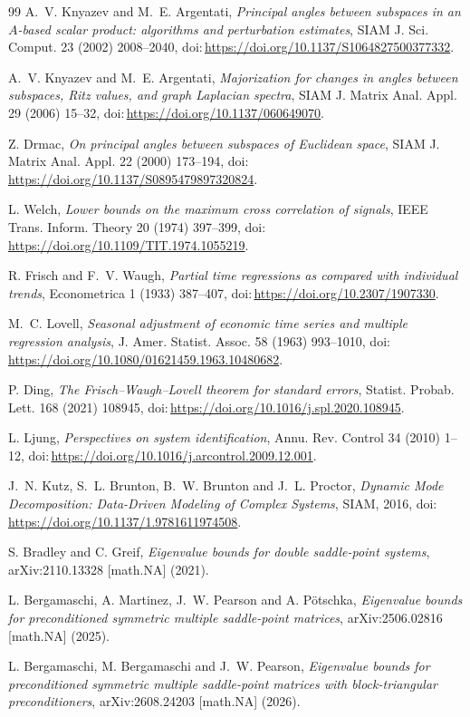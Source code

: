 \documentclass[11pt]{article}
\providecommand{\doi}[1]{\mbox{doi:}\,\url{https://doi.org/#1}}
\theoremstyle{remark}
\begin{document}
\begin{thebibliography}{99}
A.~V. Knyazev and M.~E. Argentati, \emph{Principal angles between subspaces in an $A$-based scalar
product: algorithms and perturbation estimates}, SIAM J. Sci. Comput. 23 (2002) 2008--2040,
\doi{10.1137/S1064827500377332}.

A.~V. Knyazev and M.~E. Argentati, \emph{Majorization for changes in angles between subspaces, Ritz
values, and graph Laplacian spectra}, SIAM J. Matrix Anal. Appl. 29 (2006) 15--32,
\doi{10.1137/060649070}.

Z. Drmac, \emph{On principal angles between subspaces of Euclidean space}, SIAM J. Matrix Anal.
Appl. 22 (2000) 173--194, \doi{10.1137/S0895479897320824}.

L. Welch, \emph{Lower bounds on the maximum cross correlation of signals}, IEEE Trans. Inform.
Theory 20 (1974) 397--399, \doi{10.1109/TIT.1974.1055219}.

R. Frisch and F.~V. Waugh, \emph{Partial time regressions as compared with individual trends},
Econometrica 1 (1933) 387--407, \doi{10.2307/1907330}.

M.~C. Lovell, \emph{Seasonal adjustment of economic time series and multiple regression analysis},
J. Amer. Statist. Assoc. 58 (1963) 993--1010, \doi{10.1080/01621459.1963.10480682}.

P. Ding, \emph{The Frisch--Waugh--Lovell theorem for standard errors}, Statist. Probab. Lett. 168
(2021) 108945, \doi{10.1016/j.spl.2020.108945}.

L. Ljung, \emph{Perspectives on system identification}, Annu. Rev. Control 34 (2010) 1--12,
\doi{10.1016/j.arcontrol.2009.12.001}.

J.~N. Kutz, S.~L. Brunton, B.~W. Brunton and J.~L. Proctor, \emph{Dynamic Mode Decomposition:
Data-Driven Modeling of Complex Systems}, SIAM, 2016, \doi{10.1137/1.9781611974508}.

S. Bradley and C. Greif, \emph{Eigenvalue bounds for double saddle-point systems},
arXiv:2110.13328 [math.NA] (2021).

L. Bergamaschi, A. Martinez, J.~W. Pearson and A. P\"{o}tschka, \emph{Eigenvalue bounds for
preconditioned symmetric multiple saddle-point matrices}, arXiv:2506.02816 [math.NA] (2025).

L. Bergamaschi, M. Bergamaschi and J.~W. Pearson, \emph{Eigenvalue bounds for preconditioned
symmetric multiple saddle-point matrices with block-triangular preconditioners}, arXiv:2608.24203
[math.NA] (2026).


\end{thebibliography}
\end{document}
